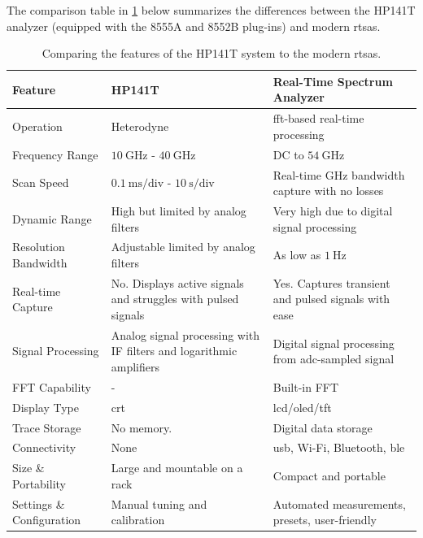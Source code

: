 \documentclass[class=report,11pt,crop=false]{standalone}
\begin{document}
	The comparison table in \ref{tab:comparing-old-to-modern} below summarizes the differences between the HP141T analyzer (equipped with the 8555A and 8552B plug-ins) and modern \acrshort{rtsa}s.
	
	 \begin{table}[ht!]
	 	\centering
	 	\begin{tabular}{|m{8em}|m{15em}|m{15em}|}
	 		\hline
	 		\textbf{Feature}	& \textbf{HP141T}	& \textbf{Real-Time Spectrum Analyzer}\\
	 		\hline
	 		Operation &	Heterodyne	&	\acrshort{fft}-based real-time processing\\
	 		\hline
	 		Frequency Range &	$\SI{10}{\giga\hertz}$	- $\SI{40}{\giga\hertz}$	&	DC to $\SI{54}{\giga\hertz}$\\
	 		\hline
	 		Scan Speed &	$\SI{0.1}{\milli\second}/\text{div}$ - $\SI{10}{\second}/\text{div}$	&		Real-time GHz bandwidth capture with no losses\\
	 		\hline
	 		Dynamic Range	&	High but limited by analog filters	& Very high due to digital signal processing\\
	 		\hline
	 		Resolution Bandwidth	&	Adjustable limited by analog filters	&	As low as $\SI{1}{\hertz}$\\
	 		\hline
	 		Real-time Capture	&	No. Displays active signals and struggles with pulsed signals &	Yes. Captures transient and pulsed signals with ease\\
	 		\hline
	 		Signal Processing	&	Analog signal processing with IF filters and logarithmic amplifiers	& Digital signal processing from \acrshort{adc}-sampled signal\\
	 		\hline
	 		FFT Capability	&	- &	Built-in FFT \\
	 		\hline
	 		Display Type	&	\acrshort{crt}	&	\acrshort{lcd}/\acrshort{oled}/\acrshort{tft}\\
	 		\hline
	 		Trace Storage	&	No memory. &	Digital data storage\\
	 		\hline
	 		Connectivity	&	None &	\acrshort{usb}, Wi-Fi, Bluetooth, \acrshort{ble}\\
	 		\hline
	 		Size \& Portability	&	Large and mountable on a rack &	Compact and portable\\
	 		\hline
	 		Settings \& Configuration	&	Manual tuning and calibration	&	Automated measurements, presets, user-friendly\\
	 		\hline
	 	\end{tabular}
 		\caption{Comparing the features of the HP141T system to the modern \acrshort{rtsa}s.}
 		\label{tab:comparing-old-to-modern}
	 \end{table}
	
\end{document}

